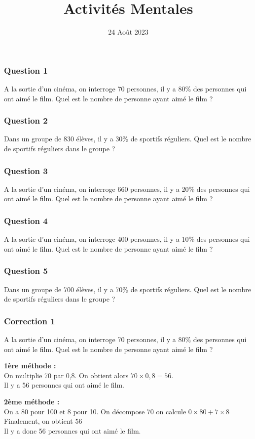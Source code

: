\documentclass[15pt, mathserif]{beamer}
\title{Activités Mentales}
\date{24 Août 2023}
\begin{document}
\begin{frame}
    \titlepage
\end{frame}

\begin{frame} 
	\frametitle{Question 1}
A la sortie d'un cinéma, on interroge 70 personnes, il y a 80\% des personnes qui ont aimé le film. Quel est le nombre de personne ayant aimé le film ?\end{frame}


\begin{frame} 
	\frametitle{Question 2}
Dans un groupe de 830 élèves, il y a 30\% de sportifs réguliers. Quel est le nombre de sportifs réguliers dans le groupe ?\end{frame}


\begin{frame} 
	\frametitle{Question 3}
A la sortie d'un cinéma, on interroge 660 personnes, il y a 20\% des personnes qui ont aimé le film. Quel est le nombre de personne ayant aimé le film ?\end{frame}


\begin{frame} 
	\frametitle{Question 4}
A la sortie d'un cinéma, on interroge 400 personnes, il y a 10\% des personnes qui ont aimé le film. Quel est le nombre de personne ayant aimé le film ?\end{frame}


\begin{frame} 
	\frametitle{Question 5}
Dans un groupe de 700 élèves, il y a 70\% de sportifs réguliers. Quel est le nombre de sportifs réguliers dans le groupe ?\end{frame}


\begin{frame}
\vspace{-10mm}
	\frametitle{Correction 1}
A la sortie d'un cinéma, on interroge 70 personnes, il y a 80\% des personnes qui ont aimé le film. Quel est le nombre de personne ayant aimé le film ? \begin{multicols}{2} \textbf{1ère méthode : \\} On multiplie 70 par 0,8. On obtient alors $70 \times 0,8=56$. \\ Il y a 56 personnes qui ont aimé le film. 
 \columnbreak 
 
 \textbf{2ème méthode :} \\ On a 80 pour 100 et 8 pour 10. On décompose 70 on calcule $0\times80+7\times8$ \\ Finalement, on obtient 56\\ Il y a donc 56 personnes qui ont aimé le film. \end{multicols}\end{frame}
\end{document}
